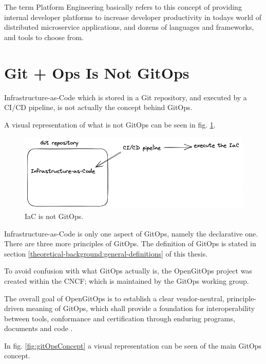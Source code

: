 The term Platform Engineering basically refers to this concept of
providing internal developer platforms to increase developer productivity
in todays world of distributed microservice applications,
and dozens of languages and frameworks,
and tools to choose from.






\section{Git + Ops Is Not GitOps}

Infrastructure-as-Code which is stored in a Git repository,
and executed by a CI/CD pipeline,
is not actually the concept behind GitOps.

A visual representation of what is not GitOps can be seen in
fig. \ref{fig:iacIsNotGitOps}.

\begin{figure}[h]
	\centering
	\includegraphics[width=1.00\linewidth]{assets/iac-is-not-gitops.png}
	\caption{IaC is not GitOps.
	}
	\label{fig:iacIsNotGitOps}	
\end{figure}

Infrastructure-as-Code is only one aspect of GitOps, namely the declarative one.
There are three more principles of GitOps.
The definition of GitOps
is stated in section \ref{theoretical-background:general-definitions} of this thesis.

To avoid confusion with what GitOps actually is, 
the OpenGitOps project
\autocite{openGitOpsProject}
was created within the CNCF;
which is maintained by the GitOps working group.

The overall goal of OpenGitOps is to establish a clear vendor-neutral,
principle-driven meaning of GitOps,
which shall provide a foundation for interoperability between tools, conformance and certification through enduring programs, documents and code
\autocite{opengitopsDocuments}.

In fig. \ref{fig:gitOpsConcept} a visual representation can be seen of the main GitOps concept.

